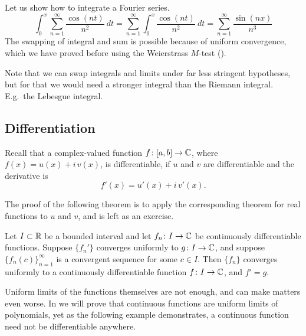 \begin{example}
Let us show how to integrate a Fourier series.
\begin{equation*}
\int_{0}^x \sum_{n=1}^\infty \frac{\cos(nt)}{n^2} ~dt
=
\sum_{n=1}^\infty \int_{0}^x \frac{\cos(nt)}{n^2}~dt
=
\sum_{n=1}^\infty \frac{\sin(nx)}{n^3}
\end{equation*}
The swapping of integral and sum is possible because of uniform convergence,
which we have proved before using the Weierstrass $M$-test
().
\end{example}

Note that we can swap integrals and limits under far less stringent hypotheses,
but for that we would need a stronger integral than the Riemann integral.
E.g.\ the Lebesgue integral.

\subsection{Differentiation}

Recall that a complex-valued function
$f \colon [a,b] \to {\mathbb{C}}$, where $f(x) = u(x)+i\,v(x)$,
is differentiable, if $u$ and $v$ are differentiable
and the derivative is
\begin{equation*}
f'(x) = u'(x)+i\,v'(x) .
\end{equation*}

The proof of the following theorem is to apply the corresponding theorem for
real functions to $u$ and $v$, and is left as an exercise.

\begin{thm} \label{thm:dersconvergecomplex}
Let $I \subset {\mathbb{R}}$ be a bounded interval and let
$f_n \colon I \to {\mathbb{C}}$ be continuously differentiable functions.
Suppose $\{ f_n' \}$ converges uniformly to $g \colon I \to {\mathbb{C}}$,
and suppose $\{ f_n(c) \}_{n=1}^\infty$ is a
convergent sequence for some $c \in I$.  Then $\{ f_n \}$ converges uniformly to 
a continuously differentiable function $f \colon I \to {\mathbb{C}}$, and $f' = g$.
\end{thm}

Uniform limits of the functions themselves are not enough, and can make
matters even worse.  In  we will prove that
continuous functions are uniform limits of polynomials, yet as the following
example demonstrates, a continuous function need not be differentiable
anywhere.

